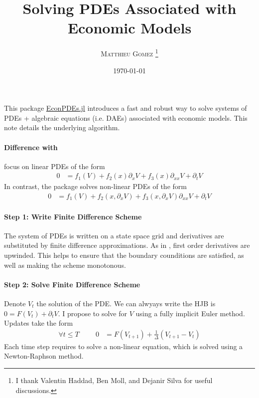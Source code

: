 \documentclass[english]{article}
\begin{document}
	\title{Solving PDEs Associated with Economic Models}
	\author{\large{\textsc{Matthieu Gomez \thanks{I thank Valentin Haddad, Ben Moll, and Dejanir Silva for useful discussions.}}}}
	\date{\today}
	\maketitle
	This package \href{https://github.com/matthieugomez/EconPDEs.jl}{EconPDEs.jl} introduces a fast and robust way to solve systems of PDEs + algebraic equations (i.e. DAEs) associated with economic models. This note details the underlying algorithm. 
	\paragraph{Difference with \citet{achdou2014heterogeneous}}
	 \citet{achdou2014heterogeneous} focus on linear PDEs of the form
	\begin{align*}
0&=f_1(V)  + f_2(x) \partial_x V  + f_3(x) \partial_{xx} V + \partial_t V
	\end{align*}
	In contrast, the package solves non-linear PDEs of the form
		\begin{align*}
			0&=f_1(V)  + f_2(x, \partial_x V)  + f_3(x, \partial_x V) \partial_{xx} V+ \partial_t V
		\end{align*}

	

	\paragraph{Step 1: Write Finite Difference Scheme}
	The system of PDEs is written on a state space grid and derivatives are substituted by finite difference approximations. As in \citet{achdou2014heterogeneous},  first order derivatives are upwinded. This helps to ensure that the boundary counditions are satisfied, as well as making the scheme monotonous.

	\paragraph{Step 2: Solve Finite Difference Scheme}

	Denote $V_t$  the solution of the PDE. We can alwyays write the HJB is $0 =F(V_t) + \partial_t V$. 
	I propose to solve for $V$ using a fully implicit Euler method.  Updates take the form 
	\begin{align*}
		\forall t \leq T \hspace{1cm} 0&= F(V_{t+1}) + \frac{1}{\Delta}(V_{t+1} -V_{t})
	\end{align*}
	Each time step requires to solve a non-linear equation, which is solved using a Newton-Raphson method. 
\end{document}

